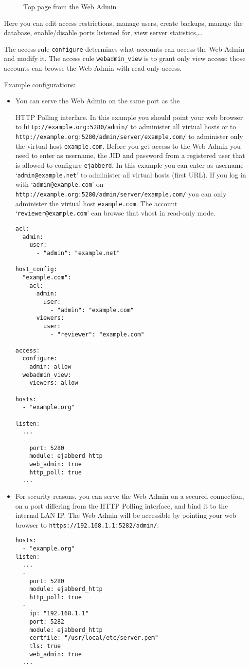 \documentclass[a4paper,10pt]{book}
\newcommand{\ind}[1]{\begin{latexonly}\index{#1}\end{latexonly}}
\newcommand{\imgscale}{0.58}
\newcommand{\insimg}[1]{\insscaleimg{\imgscale}{#1}}
\newcommand{\insscaleimg}[2]{
  \imgsrc{#2}{}
  \begin{latexonly}
    \scalebox{#1}{\texttt{[image: \#2]}}
  \end{latexonly}
}
\newcommand{\jid}[1]{\texttt{#1}}
\newcommand{\term}[1]{\texttt{#1}}
\newcommand{\ejabberd}{\texttt{ejabberd}}
\begin{document}
\begin{figure}[htbp]
  \centering
  \insimg{webadmmain.png}
  \caption{Top page from the Web Admin}
  \label{fig:webadmmain}
\end{figure}
Here you can edit access restrictions, manage users, create backups,
manage the database, enable/disable ports listened for, view server
statistics,\ldots

The access rule \term{configure} determines what accounts can access the Web Admin and modify it.
The access rule \term{webadmin\_view} is to grant only view access: those accounts can browse the Web Admin with read-only access.

Example configurations:
\begin{itemize}
\item You can serve the Web Admin on the same port as the
  \ind{protocols!XEP-0025: HTTP Polling}HTTP Polling interface. In this example
  you should point your web browser to \verb|http://example.org:5280/admin/| to
  administer all virtual hosts or to
  \verb|http://example.org:5280/admin/server/example.com/| to administer only
  the virtual host \jid{example.com}. Before you get access to the Web Admin
  you need to enter as username, the JID and password from a registered user
  that is allowed to configure \ejabberd{}. In this example you can enter as
  username `\jid{admin@example.net}' to administer all virtual hosts (first
  URL). If you log in with `\jid{admin@example.com}' on \\
  \verb|http://example.org:5280/admin/server/example.com/| you can only
  administer the virtual host \jid{example.com}.
  The account `\jid{reviewer@example.com}' can browse that vhost in read-only mode.
\begin{verbatim}
acl: 
  admin: 
    user: 
      - "admin": "example.net"

host_config: 
  "example.com": 
    acl: 
      admin: 
        user: 
          - "admin": "example.com"
      viewers: 
        user: 
          - "reviewer": "example.com"

access: 
  configure: 
    admin: allow
  webadmin_view: 
    viewers: allow

hosts: 
  - "example.org"

listen: 
  ...
  - 
    port: 5280
    module: ejabberd_http
    web_admin: true
    http_poll: true
  ...
\end{verbatim}
\item For security reasons, you can serve the Web Admin on a secured
  connection, on a port differing from the HTTP Polling interface, and bind it
  to the internal LAN IP. The Web Admin will be accessible by pointing your
  web browser to \verb|https://192.168.1.1:5282/admin/|:
\begin{verbatim}
hosts: 
  - "example.org"
listen: 
  ...
  - 
    port: 5280
    module: ejabberd_http
    http_poll: true
  - 
    ip: "192.168.1.1"
    port: 5282
    module: ejabberd_http
    certfile: "/usr/local/etc/server.pem"
    tls: true
    web_admin: true
  ...
\end{verbatim}
\end{itemize}
\end{document}
